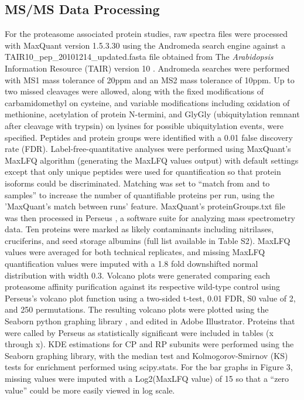 \subsection{MS/MS Data Processing}
For the proteasome associated protein studies, raw spectra files were processed with MaxQuant version 1.5.3.30 \citep{cox08} using the Andromeda search engine against a TAIR10\_pep\_20101214\_updated.fasta file obtained from The \textit{Arabidopsis} Information Resource (TAIR) version 10 \citep{berardini15}. Andromeda searches were performed with MS1 mass tolerance of 20ppm and an MS2 mass tolerance of 10ppm. Up to two missed cleavages were allowed, along with the fixed modifications of carbamidomethyl on cysteine, and variable modifications including oxidation of methionine, acetylation of protein N-termini, and GlyGly (ubiquitylation remnant after cleavage with trypsin) on lysines for possible ubiquitylation events, were specified. Peptides and protein groups were identified with a 0.01 false discovery rate (FDR). 
Label-free-quantitative analyses were performed using MaxQuant’s MaxLFQ \citep{cox14} algorithm (generating the MaxLFQ values output) with default settings except that only unique peptides were used for quantification so that protein isoforms could be discriminated.  Matching was set to “match from and to samples” to increase the number of quantifiable proteins per run, using the 'MaxQuant’s match between runs' feature. MaxQuant’s proteinGroups.txt file was then processed in Perseus \citep{tyanova16}, a software suite for analyzing mass spectrometry data. Ten proteins were marked as likely contaminants including nitrilases, cruciferins, and seed storage albumins (full list available in Table S2). MaxLFQ values were averaged for both technical replicates, and missing MaxLFQ quantification values were imputed with a 1.8 fold downshifted normal distribution with width 0.3. Volcano plots were generated comparing each proteasome affinity purification against its respective wild-type control using Perseus’s volcano plot function using a two-sided t-test, 0.01 FDR, S0 value of 2, and 250 permutations. The resulting volcano plots were plotted using the Seaborn python graphing library \citep{tyanova16, waskom16}, and edited in Adobe Illustrator. Proteins that were called by Perseus as statistically significant were included in tables (x through x). KDE estimations for CP and RP subunits were performed using the Seaborn graphing library, with the median test and Kolmogorov-Smirnov (KS) tests for enrichment performed using scipy.stats. For the bar graphs in Figure 3, missing values were imputed with a Log2(MaxLFQ value) of 15 so that a “zero value” could be more easily viewed in log scale.
